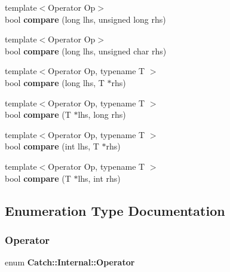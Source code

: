 \begin{DoxyCompactItemize}
\item 
{\footnotesize template$<$Operator Op$>$ }\\bool \textbf{ compare} (long lhs, unsigned long rhs)
\item 
{\footnotesize template$<$Operator Op$>$ }\\bool \textbf{ compare} (long lhs, unsigned char rhs)
\item 
{\footnotesize template$<$Operator Op, typename T $>$ }\\bool \textbf{ compare} (long lhs, T $\ast$rhs)
\item 
{\footnotesize template$<$Operator Op, typename T $>$ }\\bool \textbf{ compare} (T $\ast$lhs, long rhs)
\item 
{\footnotesize template$<$Operator Op, typename T $>$ }\\bool \textbf{ compare} (int lhs, T $\ast$rhs)
\item 
{\footnotesize template$<$Operator Op, typename T $>$ }\\bool \textbf{ compare} (T $\ast$lhs, int rhs)
\end{DoxyCompactItemize}


\subsection{Enumeration Type Documentation}
\mbox{\label{namespace_catch_1_1_internal_ae3f96598a7858155750bf38e7295d83e}} 
\subsubsection{Operator}
{\footnotesize\ttfamily enum \textbf{ Catch\+::\+Internal\+::\+Operator}}


